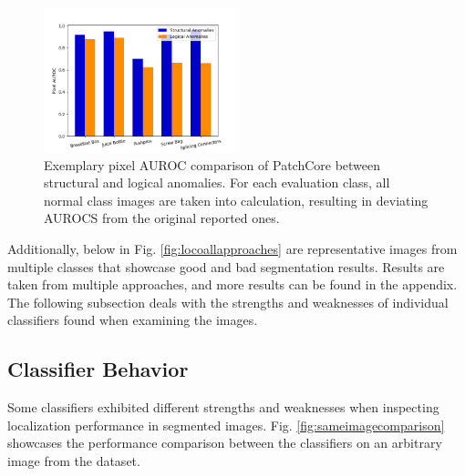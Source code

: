 \begin{figure}[H]
    \centering
    \includegraphics[width=0.5\textwidth]{figures/structvslogic.png}
    \caption{Exemplary pixel AUROC comparison of PatchCore \cite{patchCore2022} between structural and logical anomalies. For each evaluation class, all normal class images 
             are taken into calculation, resulting in deviating AUROCS from the original reported ones.}
    \label{fig:structvslogic}
\end{figure}

Additionally, below in Fig. \ref{fig:locoallapproaches} are representative images from multiple classes that showcase good and bad segmentation results. Results are taken from multiple approaches, and more results can be found in the appendix. The following subsection deals with the strengths and weaknesses of individual classifiers found when examining the images.

%
%




\subsection{Classifier Behavior}
\label{subsec:classifierbehavior}

Some classifiers exhibited different strengths and weaknesses when inspecting localization performance in segmented images. Fig. \ref{fig:sameimagecomparison} showcases 
the performance comparison between the classifiers on an arbitrary image from the dataset.



